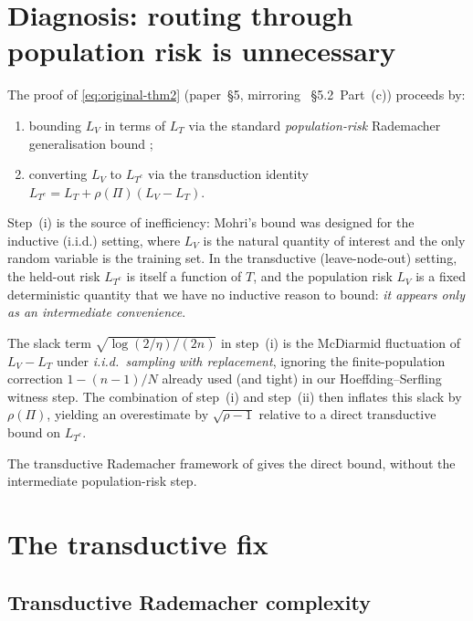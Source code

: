\documentclass[11pt,a4paper]{article}
\theoremstyle{plain}
\theoremstyle{definition}
\theoremstyle{remark}
\begin{document}
\section{Diagnosis: routing through population risk is unnecessary}
\label{sec:diagnosis}

The proof of \eqref{eq:original-thm2}
(paper~§5, mirroring \citealp{FossePallares2026applicabilityBound}~§5.2~Part~(c))
proceeds by:
\begin{enumerate}[label=(\roman*),leftmargin=*]
\item bounding $L_V$ in terms of $L_T$ via the standard \emph{population-risk}
    Rademacher generalisation bound \citep[][Theorem~3.7]{Mohri2018book};
\item converting $L_V$ to $L_{T^c}$ via the transduction identity
    $L_{T^c} = L_T + \rho(\Pi)(L_V - L_T)$.
\end{enumerate}
Step~(i) is the source of inefficiency: Mohri's bound was designed
for the inductive (i.i.d.) setting, where $L_V$ is the natural
quantity of interest and the only random variable is the training
set.  In the transductive (leave-node-out) setting, the held-out
risk $L_{T^c}$ is itself a function of $T$, and the population risk
$L_V$ is a fixed deterministic quantity that we have no inductive
reason to bound: \emph{it appears only as an intermediate convenience}.

The slack term $\sqrt{\log(2/\eta)/(2n)}$ in step~(i) is the McDiarmid
fluctuation of $L_V - L_T$ under \emph{i.i.d.\ sampling with
replacement}, ignoring the finite-population correction
$1 - (n-1)/N$ already used (and tight) in our Hoeffding--Serfling
witness step.  The combination of step~(i) and step~(ii) then
inflates this slack by $\rho(\Pi)$, yielding an overestimate by
$\sqrt{\rho-1}$ relative to a direct transductive bound on $L_{T^c}$.

The transductive Rademacher framework of
\citet{ElYanivPechyony2006,Vapnik1998} gives the direct bound,
without the intermediate population-risk step.

\section{The transductive fix}
\label{sec:fix}

\subsection{Transductive Rademacher complexity}
\end{document}
